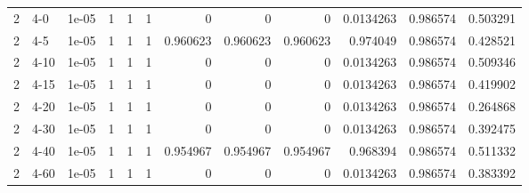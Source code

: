 \begin{tabular}{rlrrrrrrrrrr}
     2 & 4-0    &      1e-05 &           1 &                 1 &                 1 &     0           &     0           &      0           &        0.0134263 &               0.986574 &           0.503291 \\
     2 & 4-5    &      1e-05 &           1 &                 1 &                 1 &     0.960623    &     0.960623    &      0.960623    &        0.974049  &               0.986574 &           0.428521 \\
     2 & 4-10   &      1e-05 &           1 &                 1 &                 1 &     0           &     0           &      0           &        0.0134263 &               0.986574 &           0.509346 \\
     2 & 4-15   &      1e-05 &           1 &                 1 &                 1 &     0           &     0           &      0           &        0.0134263 &               0.986574 &           0.419902 \\
     2 & 4-20   &      1e-05 &           1 &                 1 &                 1 &     0           &     0           &      0           &        0.0134263 &               0.986574 &           0.264868 \\
     2 & 4-30   &      1e-05 &           1 &                 1 &                 1 &     0           &     0           &      0           &        0.0134263 &               0.986574 &           0.392475 \\
     2 & 4-40   &      1e-05 &           1 &                 1 &                 1 &     0.954967    &     0.954967    &      0.954967    &        0.968394  &               0.986574 &           0.511332 \\
     2 & 4-60   &      1e-05 &           1 &                 1 &                 1 &     0           &     0           &      0           &        0.0134263 &               0.986574 &           0.383392 \\
\hline
\end{tabular}
